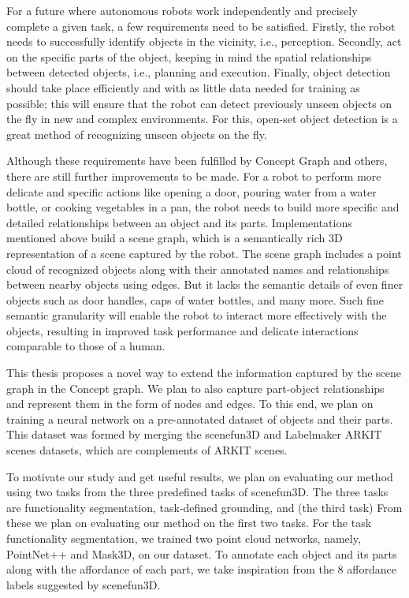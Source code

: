 For a future where autonomous robots work independently and precisely complete a given task, a few requirements need to be satisfied. 
Firstly, the robot needs to successfully identify objects in the vicinity, i.e., perception. Secondly, act on the specific parts of the object,
 keeping in mind the spatial relationships between detected objects, i.e., planning and execution. Finally, object detection should take place
  efficiently and with as little data needed for training as possible; this will ensure that the robot can detect previously unseen objects on 
  the fly in new and complex environments. For this, open-set object detection is a great method of recognizing unseen objects on the fly.
   
Although these requirements have been fulfilled by Concept Graph and others, there are still further improvements to be made. 
   For a robot to perform more delicate and specific actions like opening a door, pouring water from a water bottle, or cooking vegetables in a pan, 
   the robot needs to build more specific and detailed relationships between an object and its parts. 
   Implementations mentioned above build a scene graph, which is a semantically rich 3D representation of a scene captured by the robot. 
   The scene graph includes a point cloud of recognized objects along with their annotated names and relationships between nearby objects using edges.
    But it lacks the semantic details of even finer objects such as door handles, caps of water bottles, and many more. Such fine semantic granularity will enable 
    the robot to interact more effectively with the objects, resulting in improved task performance and delicate interactions comparable to those of a human.

    
This thesis proposes a novel way to extend the information captured by the scene graph in the Concept graph.
     We plan to also capture part-object relationships and represent them in the form of nodes and edges. 
     To this end, we plan on training a neural network on a pre-annotated dataset of objects and their parts. 
     This dataset was formed by merging the scenefun3D and Labelmaker ARKIT scenes datasets, which are complements of ARKIT scenes. 
    
     To motivate our study and get useful results, we plan on evaluating our method using two tasks from the three predefined tasks of scenefun3D. 
     The three tasks are functionality segmentation, task-defined grounding, and (the third task) From these we plan on evaluating our method on the first two tasks.
      For the task functionality segmentation, we trained two point cloud networks, namely, PointNet++ and Mask3D, on our dataset. 
      To annotate each object and its parts along with the affordance of each part, we take inspiration from the 8 affordance labels suggested by scenefun3D.
       
